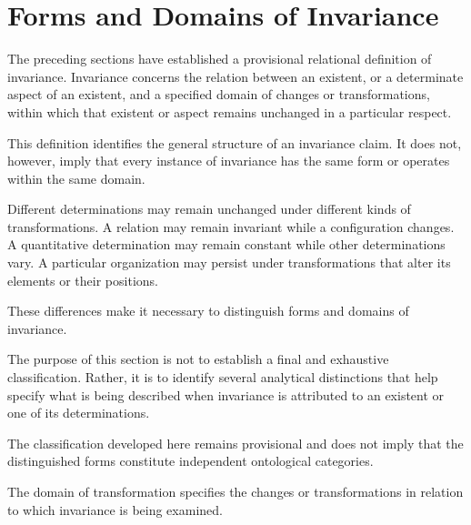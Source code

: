 

\section{Forms and Domains of Invariance}
\label{sec:forms-and-domains-of-invariance}


The preceding sections have established a
provisional relational definition of invariance.
Invariance concerns the relation between an
existent, or a determinate aspect of an existent,
and a specified domain of changes or
transformations, within which that existent
or aspect remains unchanged in a particular
respect.

This definition identifies the general structure
of an invariance claim. It does not, however,
imply that every instance of invariance has
the same form or operates within the same
domain.

Different determinations may remain unchanged
under different kinds of transformations.
A relation may remain invariant while a
configuration changes. A quantitative
determination may remain constant while
other determinations vary. A particular
organization may persist under transformations
that alter its elements or their positions.

These differences make it necessary to
distinguish forms and domains of invariance.

The purpose of this section is not to establish
a final and exhaustive classification. Rather,
it is to identify several analytical distinctions
that help specify what is being described
when invariance is attributed to an existent
or one of its determinations.

The classification developed here remains
provisional and does not imply that the
distinguished forms constitute independent
ontological categories.


The domain of transformation specifies the
changes or transformations in relation to
which invariance is being examined.

